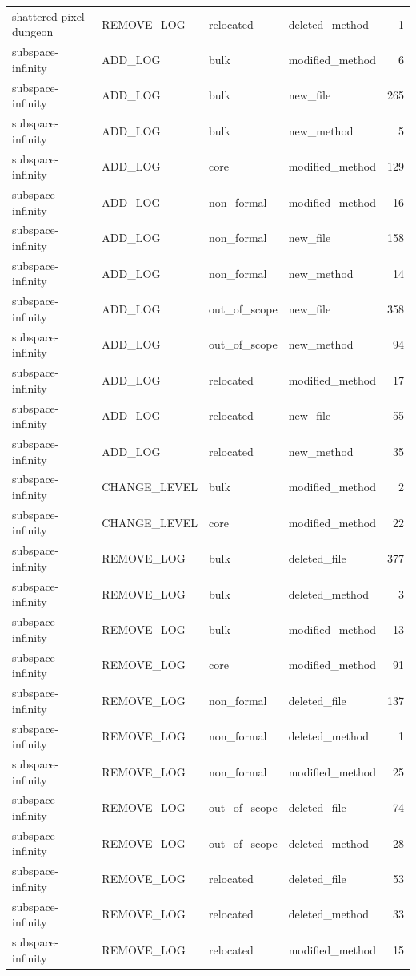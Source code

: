{\begin{longtable}{llllr}
shattered-pixel-dungeon & REMOVE\_LOG & relocated & deleted\_method & 1 \\
subspace-infinity & ADD\_LOG & bulk & modified\_method & 6 \\
subspace-infinity & ADD\_LOG & bulk & new\_file & 265 \\
subspace-infinity & ADD\_LOG & bulk & new\_method & 5 \\
subspace-infinity & ADD\_LOG & core & modified\_method & 129 \\
subspace-infinity & ADD\_LOG & non\_formal & modified\_method & 16 \\
subspace-infinity & ADD\_LOG & non\_formal & new\_file & 158 \\
subspace-infinity & ADD\_LOG & non\_formal & new\_method & 14 \\
subspace-infinity & ADD\_LOG & out\_of\_scope & new\_file & 358 \\
subspace-infinity & ADD\_LOG & out\_of\_scope & new\_method & 94 \\
subspace-infinity & ADD\_LOG & relocated & modified\_method & 17 \\
subspace-infinity & ADD\_LOG & relocated & new\_file & 55 \\
subspace-infinity & ADD\_LOG & relocated & new\_method & 35 \\
subspace-infinity & CHANGE\_LEVEL & bulk & modified\_method & 2 \\
subspace-infinity & CHANGE\_LEVEL & core & modified\_method & 22 \\
subspace-infinity & REMOVE\_LOG & bulk & deleted\_file & 377 \\
subspace-infinity & REMOVE\_LOG & bulk & deleted\_method & 3 \\
subspace-infinity & REMOVE\_LOG & bulk & modified\_method & 13 \\
subspace-infinity & REMOVE\_LOG & core & modified\_method & 91 \\
subspace-infinity & REMOVE\_LOG & non\_formal & deleted\_file & 137 \\
subspace-infinity & REMOVE\_LOG & non\_formal & deleted\_method & 1 \\
subspace-infinity & REMOVE\_LOG & non\_formal & modified\_method & 25 \\
subspace-infinity & REMOVE\_LOG & out\_of\_scope & deleted\_file & 74 \\
subspace-infinity & REMOVE\_LOG & out\_of\_scope & deleted\_method & 28 \\
subspace-infinity & REMOVE\_LOG & relocated & deleted\_file & 53 \\
subspace-infinity & REMOVE\_LOG & relocated & deleted\_method & 33 \\
subspace-infinity & REMOVE\_LOG & relocated & modified\_method & 15 \\
\end{longtable}
}
